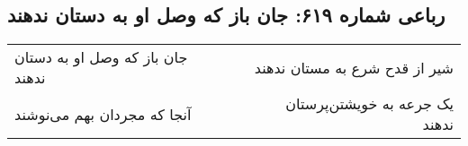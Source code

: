 \begin{center}
\section*{رباعی شماره ۶۱۹: جان باز که وصل او به دستان ندهند}
\label{sec:0619}
\begin{longtable}{l p{0.5cm} r}
جان باز که وصل او به دستان ندهند
&&
شیر از قدح شرع به مستان ندهند
\\
آنجا که مجردان بهم می‌نوشند
&&
یک جرعه به خویشتن‌پرستان ندهند
\\
\end{longtable}
\end{center}

